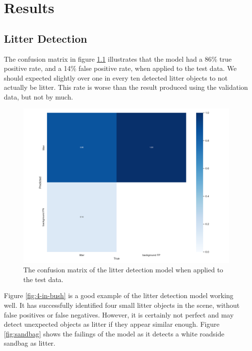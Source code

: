 \documentclass{thesis}
\begin{document}
\chapter{Results} \label{chapter:results}

\section{Litter Detection}

The confusion matrix in figure \ref{fig:fm-confusion-matrix} illustrates that the model had a 86\% true positive rate, and a 14\% false positive rate, when applied to the test data. We should expected slightly over one in every ten detected litter objects to not actually be litter. This rate is worse than the result produced using the validation data, but not by much.

\begin{figure}[h]
    \centering
    \includegraphics[scale=0.45]{images/fm-confusion-matrix.png}
    \caption{The confusion matrix of the litter detection model when applied to the test data.}
    \label{fig:fm-confusion-matrix}
\end{figure}

Figure \ref{fig:4-in-bush} is a good example of the litter detection model working well. It has successfully identified four small litter objects in the scene, without false positives or false negatives. However, it is certainly not perfect and may detect unexpected objects as litter if they appear similar enough. Figure \ref{fig:sandbag} shows the failings of the model as it detects a white roadside sandbag as litter.
\end{document}
